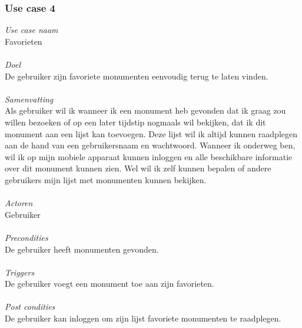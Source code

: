 \documentclass[a4paper,10pt]{article}
\begin{document}
			\subsubsection{Use case 4}
			\textit{Use case naam}\\
			Favorieten\\ \\
			\textit{Doel}\\
			De gebruiker zijn favoriete monumenten eenvoudig terug te laten vinden.\\ \\
			\textit{Samenvatting}\\
			Als gebruiker wil ik wanneer ik een monument heb gevonden dat ik graag zou willen bezoeken of op een later tijdstip nogmaals wil bekijken, dat ik dit monument aan een lijst kan toevoegen. Deze lijst wil ik altijd kunnen raadplegen aan de hand van een gebruikersnaam en wachtwoord. Wanneer ik onderweg ben, wil ik op mijn mobiele apparaat kunnen inloggen en alle beschikbare informatie over dit monument kunnen zien. Wel wil ik zelf kunnen bepalen of andere gebruikers mijn lijst met monumenten kunnen bekijken.\\ \\
			\textit{Actoren}\\
			Gebruiker\\ \\
			\textit{Precondities}\\
			De gebruiker heeft monumenten gevonden.\\ \\
			\textit{Triggers}\\
			De gebruiker voegt een monument toe aan zijn favorieten.\\ \\
			\textit{Post condities}\\
			De gebruiker kan inloggen om zijn lijst favoriete monumenten te raadplegen.	
			
\end{document}
